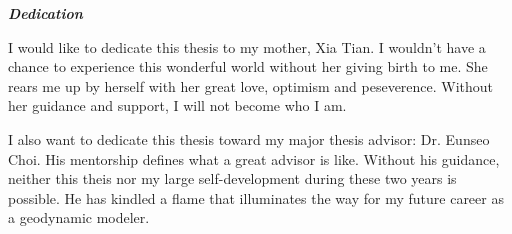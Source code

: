 \begin{center}
\textbf{\textit{Dedication}}
\end{center}

I would like to dedicate this thesis to my mother, Xia Tian. I wouldn't have a chance to experience this wonderful world without her giving birth to me. She rears me up by herself with her great love, optimism and peseverence. Without her guidance and support, I will not become who I am.

I also want to dedicate this thesis toward my major thesis advisor: Dr. Eunseo Choi. His mentorship defines what a great advisor is like. Without his  guidance, neither this theis nor my large self-development during these two years is possible. He has kindled a flame that illuminates the way for my future career as a geodynamic modeler.   

